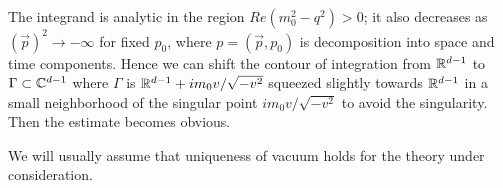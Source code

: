 The integrand is
 analytic in the region $Re(m_0^2-q^2)>0$; it also 
  decreases as $(\vec{p})^2\to -\infty $ for fixed $p_0$, where  $p=(
 \vec{p},p_0)$ is decomposition into space and time components. Hence 
we can shift the
contour of integration from ${\Bbb R}^{d-1}$ to $\Gamma\subset {\Bbb C}^{d-1}$ where 
$\Gamma$ is ${\Bbb R}^{d-1}+im_0 v/\sqrt{-v^2}$ squeezed slightly towards
${\Bbb R}^{d-1}$ in a small neighborhood
of the singular point $im_0 v/\sqrt{-v^2}$ to avoid the singularity.
Then the estimate becomes obvious. 



\enddemo

We will  usually assume that uniqueness of vacuum holds for the theory
under consideration.  

\enddocument


